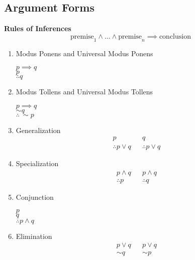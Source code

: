 \documentclass[landscape, a4paper]{article}
\newcommand{\Or}{\vee}
\renewcommand{\and}{\wedge}
\newcommand{\customsection}[1]{%
    \vspace*{-16pt}%
    \section*{#1}%
    \vspace*{-5pt}%
}
\begin{document}
\begin{multicols*}{4}
    \customsection{Argument Forms}
    \noindent\textbf{Rules of Inferences}
    \[
        \text{premise}_1\and \ldots\and \text{premise}_n \implies \text{conclusion}
    \]
    \begin{enumerate}[wide, labelindent=2pt]
        \item Modus Ponens and Universal Modus Ponens
              \vspace{-4pt} \par {\centering
                  $p \implies q$ \\
                  $p$           \\
                  $\therefore q $ \par
              }
        \item Modus Tollens and Universal Modus Tollens
              \vspace{-4pt} \par {\centering
              $p \implies q$ \\
              ${\sim} q$           \\
              $\therefore\ {\sim} p $ \par
              }
        \item Generalization
              \begin{align*}
                  p                   &  & q                  \\
                  \therefore p  \Or q &  & \therefore p \Or q
              \end{align*}
        \item Specialization
              \begin{align*}
                  p \and q     &  & p \and q     \\
                  \therefore p &  & \therefore q
              \end{align*}
        \item Conjunction
              \vspace{-4pt} \par {\centering
                  $p$ \\
                  $q$           \\
                  $\therefore p \and q $ \par
              }
        \item Elimination
              \begin{align*}
                  p \Or q      &  & p \Or q      \\
                  {\sim} q     &  & {\sim} p     \\

\end{align*}
\end{enumerate}
\end{multicols*}
\end{document}
